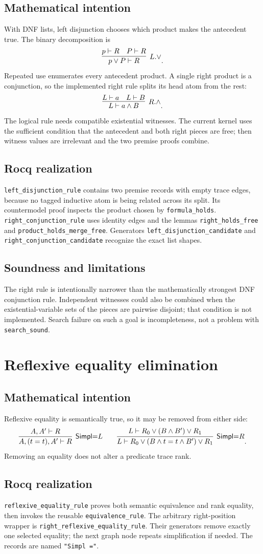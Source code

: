 \documentclass[11pt,oneside]{book}
\DeclareRobustCommand{\code}[1]{\nolinkurl{#1}}
\newcommand{\mathintent}{\subsection*{Mathematical intention}}
\newcommand{\rocqreal}{\subsection*{Rocq realization}}
\newcommand{\soundlim}{\subsection*{Soundness and limitations}}
\begin{document}
\mathintent

With DNF lists, left disjunction chooses which product makes the antecedent
true.  The binary decomposition is
\[
 \infer[L.\lor]
       {p\lor P\vdash R}
       {p\vdash R & P\vdash R}.
\]
Repeated use enumerates every antecedent product.  A single right product is a
conjunction, so the implemented right rule splits its head atom from the rest:
\[
 \infer[R.\land]
       {L\vdash a\land B}
       {L\vdash a & L\vdash B}.
\]
The logical rule needs compatible existential witnesses.  The current kernel
uses the sufficient condition that the antecedent and both right pieces are
free; then witness values are irrelevant and the two premise proofs combine.

\rocqreal

\code{left_disjunction_rule} contains two premise records with empty trace
edges, because no tagged inductive atom is being related across its split.
Its countermodel proof inspects the product chosen by
\code{formula_holds}.  \code{right_conjunction_rule} uses identity edges and
the lemmas \code{right_holds_free} and \code{product_holds_merge_free}.
Generators \code{left_disjunction_candidate} and
\code{right_conjunction_candidate} recognize the exact list shapes.

\soundlim

The right rule is intentionally narrower than the mathematically strongest
DNF conjunction rule.  Independent witnesses could also be combined when the
existential-variable sets of the pieces are pairwise disjoint; that condition
is not implemented.  Search failure on such a goal is incompleteness, not a
problem with \code{search_sound}.

\section{Reflexive equality elimination}

\mathintent

Reflexive equality is semantically true, so it may be removed from either side:
\[
 \infer[\mathsf{Simpl}{=}L]
       {A,(t=t),A'\vdash R}{A,A'\vdash R}
 \qquad
 \infer[\mathsf{Simpl}{=}R]
       {L\vdash R_0\lor(B\land t=t\land B')\lor R_1}
       {L\vdash R_0\lor(B\land B')\lor R_1}.
\]
Removing an equality does not alter a predicate trace rank.

\rocqreal

\code{reflexive_equality_rule} proves both semantic equivalence and rank
equality, then invokes the reusable \code{equivalence_rule}.  The arbitrary
right-position wrapper is \code{right_reflexive_equality_rule}.  Their
generators remove exactly one selected equality; the next graph node repeats
simplification if needed.  The records are named \code{"Simpl ="}.
\end{document}
